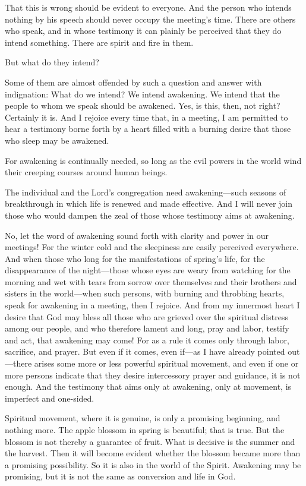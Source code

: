 That this is wrong should be evident to everyone. And the person who intends nothing by his speech should never occupy the meeting’s time. There are others who speak, and in whose testimony it can plainly be perceived that they do intend something. There are spirit and fire in them.

But what do they intend?

Some of them are almost offended by such a question and answer with indignation: What do we intend? We intend awakening. We intend that the people to whom we speak should be awakened. Yes, is this, then, not right? Certainly it is. And I rejoice every time that, in a meeting, I am permitted to hear a testimony borne forth by a heart filled with a burning desire that those who sleep may be awakened.

For awakening is continually needed, so long as the evil powers in the world wind their creeping courses around human beings.

The individual and the Lord’s congregation need awakening—such seasons of breakthrough in which life is renewed and made effective. And I will never join those who would dampen the zeal of those whose testimony aims at awakening.

No, let the word of awakening sound forth with clarity and power in our meetings! For the winter cold and the sleepiness are easily perceived everywhere. And when those who long for the manifestations of spring’s life, for the disappearance of the night—those whose eyes are weary from watching for the morning and wet with tears from sorrow over themselves and their brothers and sisters in the world—when such persons, with burning and throbbing hearts, speak for awakening in a meeting, then I rejoice. And from my innermost heart I desire that God may bless all those who are grieved over the spiritual distress among our people, and who therefore lament and long, pray and labor, testify and act, that awakening may come! For as a rule it comes only through labor, sacrifice, and prayer. But even if it comes, even if—as I have already pointed out—there arises some more or less powerful spiritual movement, and even if one or more persons indicate that they desire intercessory prayer and guidance, it is not enough. And the testimony that aims only at awakening, only at movement, is imperfect and one-sided.

Spiritual movement, where it is genuine, is only a promising beginning, and nothing more. The apple blossom in spring is beautiful; that is true. But the blossom is not thereby a guarantee of fruit. What is decisive is the summer and the harvest. Then it will become evident whether the blossom became more than a promising possibility. So it is also in the world of the Spirit. Awakening may be promising, but it is not the same as conversion and life in God.

